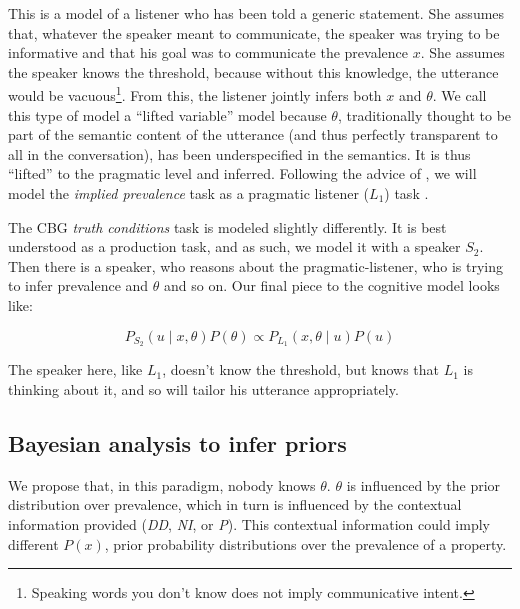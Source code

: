 \documentclass[10pt,letterpaper]{article}
\begin{document}
This is a model of a listener who has been told a generic statement. She assumes that, whatever the speaker meant to communicate, the speaker was trying to be informative and that his goal was to communicate the prevalence $x$. She assumes the speaker knows the threshold, because without this knowledge, the utterance would be vacuous\footnote{Speaking words you don't know does not imply communicative intent.}.  From this, the listener jointly infers both $x$ and $\theta$. We call this type of model a ``lifted variable'' model because $\theta$, traditionally thought to be part of the semantic content of the utterance (and thus perfectly transparent to all in the conversation), has been underspecified in the semantics. It is thus ``lifted'' to the pragmatic level and inferred. Following the advice of , we will model the \emph{implied prevalence} task as a pragmatic listener ($L_{1}$) task .  

The CBG \emph{truth conditions} task is modeled slightly differently. It is best understood as a production task, and as such, we model it with a speaker $S_{2}$. Then there is a speaker, who reasons about the pragmatic-listener, who is trying to infer prevalence and $\theta$ and so on. Our final piece to the cognitive model looks like:

$$ P_{S_{2}}(u \mid x, \theta) P(\theta) \propto P_{L_{1}}(x , \theta \mid u) P(u)  $$

%			
%			

The speaker here, like $L_{1}$, doesn't know the threshold, but knows that $L_{1}$ is thinking about it, and so will tailor his utterance appropriately.

\subsection{Bayesian analysis to infer priors}

We propose that, in this paradigm, nobody knows $\theta$.  $\theta$ is influenced by the prior distribution over prevalence, which in turn is influenced by the contextual information provided (\emph{DD}, \emph{NI}, or \emph{P}). This contextual information could imply different $P(x)$, prior probability distributions over the prevalence of a property. 
\end{document}
